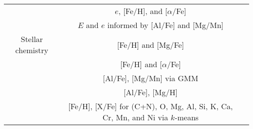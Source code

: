 \begin{table*}
\begin{tabular}{c|c|c}
        & $e$, [Fe/H], and [$\alpha$/Fe] & \citet{Naidu2020} \\
        & $E$ and $e$ informed by [Al/Fe] and [Mg/Mn] & \citet{Horta2021} \\
        \hline
        Stellar chemistry & [Fe/H] and [Mg/Fe] & \citet{DiMatteo2019, DiMatteo2020} \\
        & [Fe/H] and [$\alpha$/Fe] & \citet{Carollo2021} \\
        & [Al/Fe], [Mg/Mn] via GMM & \citet{Das2020} \\
        & [Al/Fe], [Mg/H] & \citet{Feuillet2021} \\
        & [Fe/H], [X/Fe] for (C+N), O, Mg, Al, Si, K, Ca, Cr, Mn, and Ni via $k$-means & \citet{Hayes2018} \\
        \hline
    \end{tabular}
    \label{tab:selection_techniques}
\end{table*}


